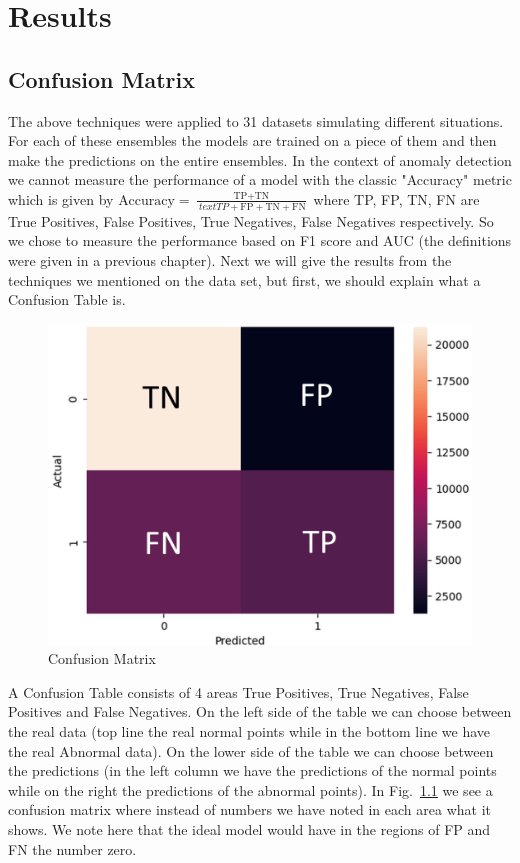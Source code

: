 \documentclass[a4paper,12pt]{report}
\theoremstyle{definitionNODot}
\begin{document}
	\chapter{Results}
	\section{Confusion Matrix}
	The above techniques were applied to 31 datasets simulating different situations. For each of these ensembles the models are trained on a piece of them and then make the predictions on the entire ensembles. In the context of anomaly detection we cannot measure the performance of a model with the classic "Accuracy" metric which is given by $\text{Accuracy} = \frac{\text{TP}+\text{TN}}{\ text{TP}+\text{FP}+\text{TN}+\text{FN}}$ where TP, FP, TN, FN are True Positives, False Positives, True Negatives, False Negatives respectively. So we chose to measure the performance based on F1 score and AUC (the definitions were given in a previous chapter). Next we will give the results from the techniques we mentioned on the data set, but first, we should explain what a Confusion Table is.
	
	\begin{figure}[h]
		\centering
		\includegraphics[width=\textwidth/2]{confusionmatrixexplain.png}
		\caption{Confusion Matrix}
		\label{fig:confusionmatrixexplain}
	\end{figure}
	
	A Confusion Table consists of 4 areas True Positives, True Negatives, False Positives and False Negatives. On the left side of the table we can choose between the real data (top line the real normal points while in the bottom line we have the real Abnormal data). On the lower side of the table we can choose between the predictions (in the left column we have the predictions of the normal points while on the right the predictions of the abnormal points). In Fig.~\ref{fig:confusionmatrixexplain} we see a confusion matrix where instead of numbers we have noted in each area what it shows. We note here that the ideal model would have in the regions of FP and FN the number zero.
	
\end{document}
